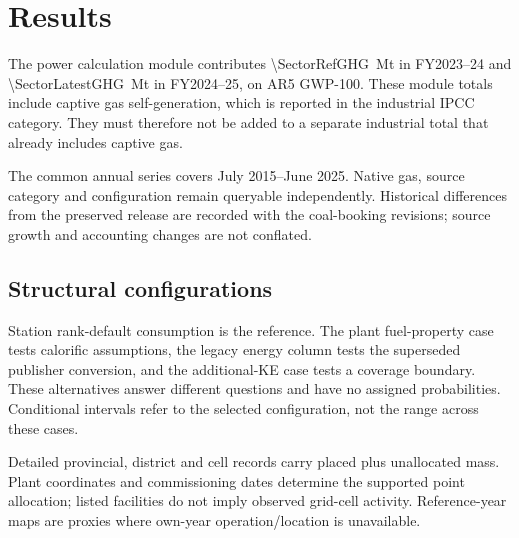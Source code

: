 \section{Results}
\label{sec:results}
The power calculation module contributes \SI{\SectorRefGHG}{\mega\tonne} \COe{} in FY2023--24 and \SI{\SectorLatestGHG}{\mega\tonne} in FY2024--25, on AR5 GWP-100. These module totals include captive gas self-generation, which is reported in the industrial IPCC category. They must therefore not be added to a separate industrial total that already includes captive gas.

The common annual series covers July 2015--June 2025. Native gas, source category and configuration remain queryable independently. Historical differences from the preserved release are recorded with the coal-booking revisions; source growth and accounting changes are not conflated.

\subsection{Structural configurations}\label{tab:scenarios}
Station rank-default consumption is the reference. The plant fuel-property case tests calorific assumptions, the legacy energy column tests the superseded publisher conversion, and the additional-KE case tests a coverage boundary. These alternatives answer different questions and have no assigned probabilities. Conditional intervals refer to the selected configuration, not the range across these cases.

Detailed provincial, district and cell records carry placed plus unallocated mass. Plant coordinates and commissioning dates determine the supported point allocation; listed facilities do not imply observed grid-cell activity. Reference-year maps are proxies where own-year operation/location is unavailable.
